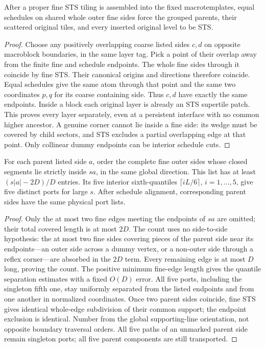 \begin{lemma}\label{lem:alignment-tuple}
After a proper fine STS tiling is assembled into the fixed macrotemplates,
equal schedules on shared whole outer fine sides force the grouped parents,
their scattered original tiles, and every inserted original level to be STS.
\end{lemma}
\begin{proof}
Choose any positively overlapping coarse listed sides $c,d$ on opposite
macroblock boundaries, in the same layer tag. Pick a point of their overlap
away from the finite fine and schedule endpoints. The whole fine sides
through it coincide by fine STS. Their canonical origins and directions
therefore coincide. Equal schedules give the same atom through that point
and the same two coordinates $p,q$ for its coarse containing side.
Thus $c,d$ have exactly the same endpoints. Inside a block each original
layer is already an STS supertile patch. This proves every layer separately,
even at a persistent interface with no common higher ancestor.
A genuine corner cannot lie inside a fine side: its wedge must be covered
by child sectors, and STS excludes a partial overlapping edge at that point.
Only collinear dummy endpoints can be interior schedule cuts.
\end{proof}

\begin{lemma}\label{lem:whole-ports}
For each parent listed side $a$, order the complete fine outer sides whose
closed segments lie strictly inside $sa$, in the same global direction.
This list has at least $(s|a|-2D)/D$ entries. Its five interior sixth-quantiles
$\lceil iL/6\rceil$, $i=1,\ldots,5$, give five distinct ports for large $s$. After schedule
alignment, corresponding parent sides have the same physical port lists.
\end{lemma}
\begin{proof}
Only the at most two fine edges meeting the endpoints of $sa$ are omitted;
their total covered length is at most $2D$. The count uses no side-to-side
hypothesis: the at most two fine sides covering pieces of the parent side
near its endpoints---an outer side across a dummy vertex, or a non-outer side
through a reflex corner---are absorbed in the $2D$ term. Every remaining edge is at most
$D$ long, proving the count. The positive minimum fine-edge length gives
the quantile separation estimates with a fixed $O(D)$ error. All five ports,
including the singleton fifth one, stay uniformly separated from the listed
endpoints and from one another in normalized coordinates.
Once two parent sides coincide, fine STS gives identical whole-edge
subdivision of their common support; the endpoint exclusion is identical.
Number from the global supporting-line orientation, not opposite boundary
traversal orders. All five paths of an unmarked parent side remain singleton
ports; all five parent components are still transported.
\end{proof}

